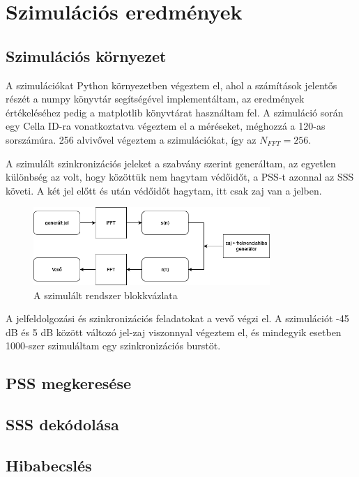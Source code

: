 \chapter{Szimulációs eredmények}

\section{Szimulációs környezet}

A szimulációkat Python környezetben végeztem el, ahol a számítások jelentős részét a numpy könyvtár segítségével implementáltam, az eredmények értékeléséhez pedig a matplotlib könyvtárat használtam fel.
A szimuláció során egy Cella ID-ra vonatkoztatva végeztem el a méréseket, méghozzá a 120-as sorszámúra.
256 alvivővel végeztem a szimulációkat, így az $N_{FFT} = 256$.

A szimulált szinkronizációs jeleket a szabvány szerint generáltam, az egyetlen különbség az volt, hogy közöttük nem hagytam védőidőt, a PSS-t azonnal az SSS követi.
A két jel előtt és után védőidőt hagytam, itt csak zaj van a jelben.

\begin{figure}[h]
    \centering
    \includegraphics[keepaspectratio, width = 0.8\textwidth]{onlab.drawio.png}
    \caption{A szimulált rendszer blokkvázlata}
\end{figure}

A jelfeldolgozási és szinkronizációs feladatokat a vevő végzi el.
A szimulációt -45 dB és 5 dB között változó jel-zaj viszonnyal végeztem el, és mindegyik esetben 1000-szer szimuláltam egy szinkronizációs burstöt.

\section{PSS megkeresése}

\section{SSS dekódolása}

\section{Hibabecslés}



